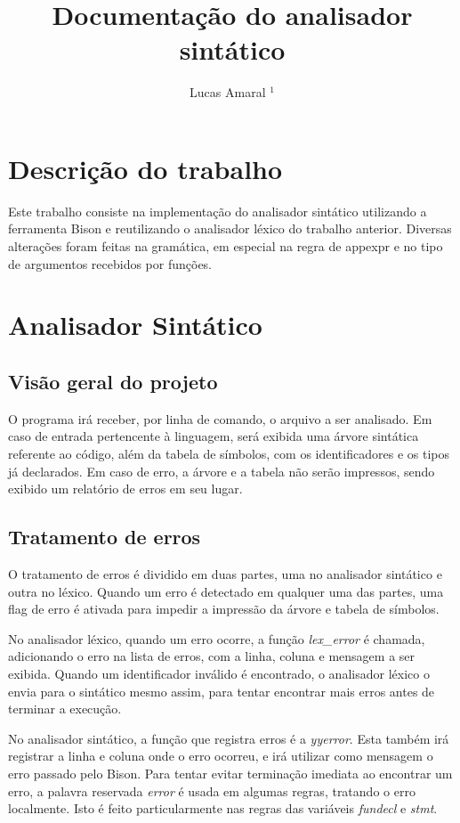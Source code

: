 \documentclass[11pt]{article}
\title{Documentação do analisador sintático}
\author{Lucas Amaral $^1$}
\begin{document}
\maketitle


\section{Descrição do trabalho}

Este trabalho consiste na implementação do analisador sintático utilizando a ferramenta Bison e reutilizando o analisador léxico do trabalho anterior.
Diversas alterações foram feitas na gramática, em especial na regra de appexpr e no tipo de argumentos recebidos por funções.

\section{Analisador Sintático}

\subsection{Visão geral do projeto}

O programa irá receber, por linha de comando, o arquivo a ser analisado. 
Em caso de entrada pertencente à linguagem, será exibida uma árvore sintática referente ao código,
além da tabela de símbolos, com os identificadores e os tipos já declarados.
Em caso de erro, a árvore e a tabela não serão impressos, sendo exibido um relatório de erros em seu lugar.

\subsection{Tratamento de erros}

O tratamento de erros é dividido em duas partes, uma no analisador sintático e outra no léxico.
Quando um erro é detectado em qualquer uma das partes, uma flag de erro é ativada para impedir
a impressão da árvore e tabela de símbolos.

No analisador léxico, quando um erro ocorre, a função \emph{lex\_error} é chamada, adicionando o erro na lista de erros,
com a linha, coluna e mensagem a ser exibida. Quando um identificador inválido é encontrado, o analisador léxico
o envia para o sintático mesmo assim, para tentar encontrar mais erros antes de terminar a execução.

No analisador sintático, a função que registra erros é a \emph{yyerror}. Esta também irá registrar a linha e coluna
onde o erro ocorreu, e irá utilizar como mensagem o erro passado pelo Bison.
Para tentar evitar terminação imediata ao encontrar um erro, a palavra reservada \emph{error} é usada em algumas regras,
tratando o erro localmente. Isto é feito particularmente nas regras das variáveis \emph{fundecl} e \emph{stmt}.   
\end{document}
